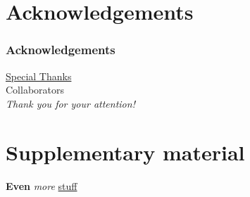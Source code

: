 \documentclass{beamer}
\begin{document}
\appendix


\section{Acknowledgements}

\begin{frame}
  \frametitle{Acknowledgements}
  \centering
  \underline{Special Thanks} \\ [0.5ex]
  Collaborators \\ [10ex]
  \pause
  \textit{Thank you for your attention!}
\end{frame}



\section{Supplementary material}

\begin{frame}[allowframebreaks]
  \centering
  \textbf{Even} \textit{more} \underline{stuff}
\end{frame}
\end{document}
